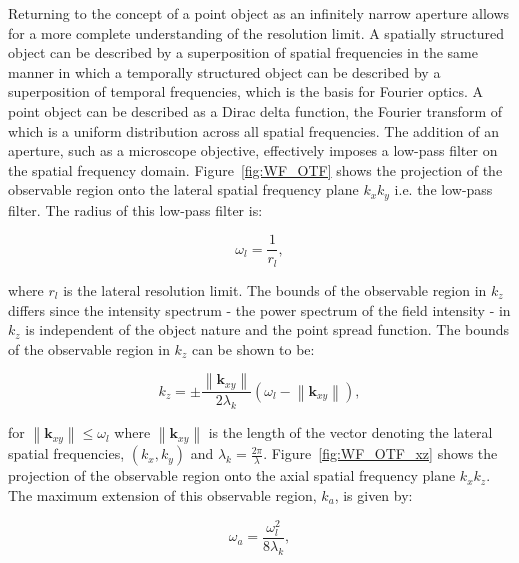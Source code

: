 Returning to the concept of a point object as an infinitely narrow aperture allows 
for a more complete understanding of the resolution limit. A spatially structured 
object can be described by a superposition of spatial frequencies in the same 
manner in which a temporally structured object can be described by a superposition 
of temporal frequencies, which is the basis for Fourier 
optics\cite{goodman2005introduction}. A point object can be described as a Dirac
delta function, the Fourier transform of which is a uniform distribution across all
spatial frequencies. The addition of an aperture, such as a microscope objective, 
effectively imposes a low-pass filter on the spatial frequency domain. 
Figure~\ref{fig:WF_OTF} shows the projection of the observable region onto the 
lateral spatial frequency plane $k_{x}k_{y}$ i.e. the low-pass filter. The radius of
this low-pass filter is: 

\begin{equation}\label{eq:lateral_spatial_freq_res}
\omega_{l} = \frac{1}{r_{l}},
\end{equation}

where $r_{l}$ is the lateral resolution limit. The bounds of the observable region 
in $k_{z}$ differs since the intensity spectrum - the power spectrum of the 
field intensity - in $k_{z}$ is independent of the object nature and the point
spread function\cite{frieden1967optical}. The bounds of the observable region in
$k_{z}$ can be shown to be:

\begin{equation}\label{eq:observable_region_kz}
k_{z} = \pm\frac{\left\|\textbf{k}_{xy}\right\|}{2\lambda_{k}}(\omega_{l} - \left\|\textbf{k}_{xy}\right\|),
\end{equation}

for $\left\|\textbf{k}_{xy}\right\| \le \omega_{l}$ where 
$\left\|\textbf{k}_{xy}\right\|$ is the length of the vector denoting the 
lateral spatial frequencies, $(k_{x},k_{y})$ and $\lambda_{k} = 
\frac{2\pi}{\lambda}$\cite{frieden1967optical}. Figure~\ref{fig:WF_OTF_xz} shows 
the projection of the observable region onto the axial spatial frequency plane 
$k_{x}k_{z}$. The maximum extension of this observable region, $k_{a}$, is given 
by:

\begin{equation}\label{eq:axial_observable_max_k}
\omega_{a} = \frac{\omega_{l}^{2}}{8\lambda_{k}},
\end{equation}

